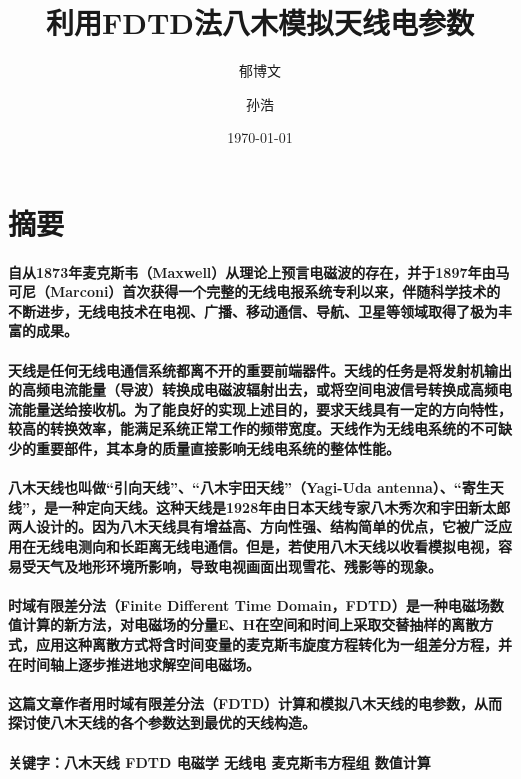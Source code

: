 \documentclass[UTF8]{ctexart}
\title{利用FDTD法八木模拟天线电参数}
\author{郁博文 \and 孙浩}
\date{\today}
\begin{document}
\maketitle
\newpage
\tableofcontents
\newpage
\section{摘要}
\paragraph{自从1873年麦克斯韦（Maxwell）从理论上预言电磁波的存在，并于1897年由马可尼（Marconi）首次获得一个完整的无线电报系统专利以来，伴随科学技术的不断进步，无线电技术在电视、广播、移动通信、导航、卫星等领域取得了极为丰富的成果。}
\paragraph{天线是任何无线电通信系统都离不开的重要前端器件。天线的任务是将发射机输出的高频电流能量（导波）转换成电磁波辐射出去，或将空间电波信号转换成高频电流能量送给接收机。为了能良好的实现上述目的，要求天线具有一定的方向特性，较高的转换效率，能满足系统正常工作的频带宽度。天线作为无线电系统的不可缺少的重要部件，其本身的质量直接影响无线电系统的整体性能。}
\paragraph{八木天线也叫做“引向天线”、“八木宇田天线”（Yagi-Uda antenna）、“寄生天线”，是一种定向天线。这种天线是1928年由日本天线专家八木秀次和宇田新太郎两人设计的。因为八木天线具有增益高、方向性强、结构简单的优点，它被广泛应用在无线电测向和长距离无线电通信。但是，若使用八木天线以收看模拟电视，容易受天气及地形环境所影响，导致电视画面出现雪花、残影等的现象。}
\paragraph{时域有限差分法（Finite Different Time Domain，FDTD）是一种电磁场数值计算的新方法，对电磁场的分量E、H在空间和时间上采取交替抽样的离散方式，应用这种离散方式将含时间变量的麦克斯韦旋度方程转化为一组差分方程，并在时间轴上逐步推进地求解空间电磁场。}
\paragraph{这篇文章作者用时域有限差分法（FDTD）计算和模拟八木天线的电参数，从而探讨使八木天线的各个参数达到最优的天线构造。}
\paragraph{关键字：八木天线 FDTD 电磁学 无线电 麦克斯韦方程组 数值计算}
\newpage
\end{document}
